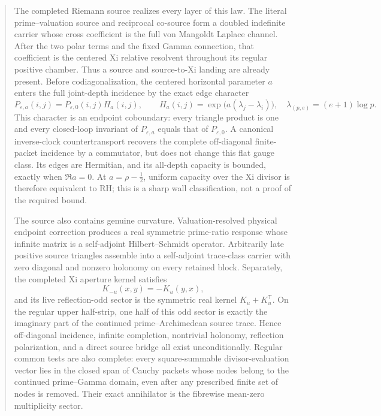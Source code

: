 \documentclass[11pt]{article}
\theoremstyle{definition}
\theoremstyle{remark}
\begin{document}
\begin{abstract}
The completed Riemann source realizes every layer of this law.  The literal
prime--valuation source and reciprocal co-source form a doubled indefinite
carrier whose cross coefficient is the full von Mangoldt Laplace channel.
After the two polar terms and the fixed Gamma connection, that coefficient is
the centered Xi relative resolvent throughout its regular positive chamber.
Thus a source and source-to-Xi landing are already present.  Before
codiagonalization, the centered horizontal parameter \(a\) enters the full
joint-depth incidence by the exact edge character
\[
 P_{\varepsilon,a}(i,j)=P_{\varepsilon,0}(i,j)
      H_a(i,j),\qquad
 H_a(i,j)=\exp\!\bigl(a(\lambda_j-\lambda_i)\bigr),
 \quad \lambda_{(p,e)}=(e+1)\log p.
\]
This character is an endpoint coboundary: every triangle product is one and
every closed-loop invariant of \(P_{\varepsilon,a}\) equals that of
\(P_{\varepsilon,0}\).  A canonical inverse-clock countertransport recovers
the complete off-diagonal finite-packet incidence by a commutator, but does
not change this flat gauge class.  Its edges are Hermitian, and its all-depth
capacity is bounded, exactly when \(\Re a=0\).  At
\(a=\rho-\tfrac12\), uniform capacity over the Xi divisor is therefore
equivalent to RH; this is a sharp wall classification, not a proof of the
required bound.

The source also contains genuine curvature.  Valuation-resolved physical
endpoint correction produces a real symmetric prime-ratio response whose
infinite matrix is a self-adjoint Hilbert--Schmidt operator.  Arbitrarily late
positive source triangles assemble into a self-adjoint trace-class carrier
with zero diagonal and nonzero holonomy on every retained block.  Separately,
the completed Xi aperture kernel satisfies
\[
 K_{-u}(x,y)=-K_u(y,x),
\]
and its live reflection-odd sector is the symmetric real kernel
\(K_u+K_u^{\mathsf T}\).  On the regular upper half-strip, one half of this
odd sector is exactly the imaginary part of the continued prime--Archimedean
source trace.  Hence off-diagonal incidence, infinite completion, nontrivial
holonomy, reflection polarization, and a direct source bridge all exist
unconditionally.  Regular common tests are also complete: every
square-summable divisor-evaluation vector lies in the closed span of Cauchy
packets whose nodes belong to the continued prime--Gamma domain, even after
any prescribed finite set of nodes is removed.  Their exact annihilator is
the fibrewise mean-zero multiplicity sector.


\end{abstract}
\end{document}

